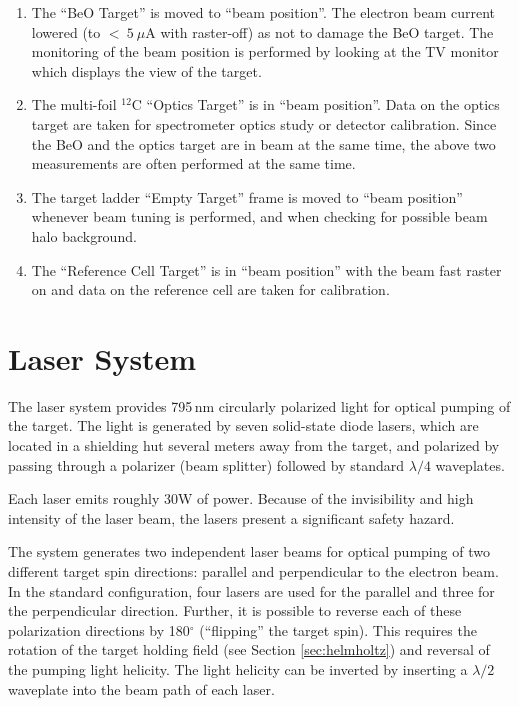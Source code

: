 {\begin{safetyen}{10}{5}
\begin{enumerate}
\item 
The ``BeO Target'' is moved to ``beam position''.
The electron beam current lowered (to $<~5~\mu$A with raster-off) 
as not to damage the 
BeO target.  The monitoring of the beam
position is performed by looking at the TV monitor which displays the
view of the target.

\item 
The multi-foil $^{12}$C ``Optics Target'' is in ``beam position''. Data on the optics
target are taken for spectrometer optics study or detector calibration.
Since the BeO and the optics target are in beam at the same time, the above 
two measurements are often performed at the same time.

\item 
The target ladder ``Empty Target''
 frame is moved to ``beam position'' whenever
beam tuning is performed, and when checking for possible beam halo
background.

\item  
The ``Reference Cell Target'' is in ``beam position'' with the beam fast
raster on and data on the reference cell are taken for calibration.


\end{enumerate}

\end{safetyen}
\section{Laser System}
\label{sec:lasers}

The laser system provides 795\,nm circularly polarized light for optical
pumping of the target. The light is generated by seven solid-state
diode lasers, which are located in a shielding hut several meters 
away from the target, and polarized by passing through a polarizer 
(beam splitter) followed by standard $\lambda/4$ waveplates.  
\begin{safetyen}{10}{5}
Each laser emits roughly 30W of
power.  Because of the invisibility and high intensity of the
laser beam, the lasers present a significant safety hazard.
\end{safetyen}
The system generates two independent laser beams for optical
pumping of two different target spin directions: parallel
and perpendicular to the electron beam.  In the standard
configuration, four lasers are used for the parallel and three for the
perpendicular direction.  Further, it is possible to reverse each of these
polarization directions by 180$^\circ$ (``flipping'' the target spin). 
This requires the rotation of the target holding field (see Section
\ref{sec:helmholtz}) and reversal of the pumping light helicity.  
The light helicity can be inverted by inserting a $\lambda/2$ waveplate 
into the beam path of each laser.

}
